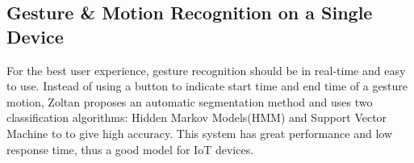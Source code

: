 
\subsection{Gesture \& Motion Recognition on a Single Device}


For the best user experience, gesture recognition should be in real-time and easy to use. Instead of using a button to indicate start time and end time of a gesture motion, Zoltan \cite{Zoltan} proposes an automatic segmentation method and uses two classification algorithms: Hidden Markov Models(HMM) and Support Vector Machine to to give high accuracy. This system has great performance and low response time, thus a good model for \gls{IoT} devices.


